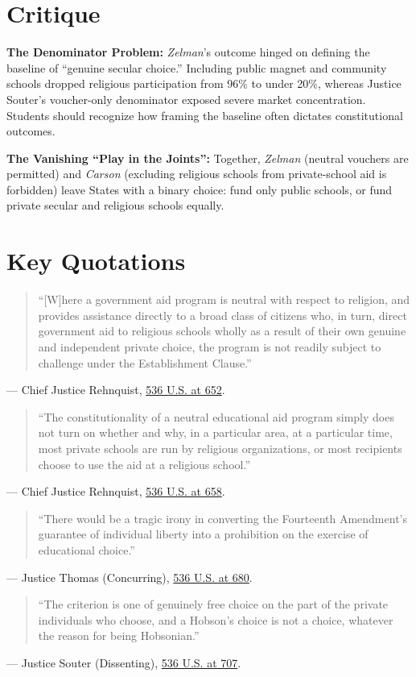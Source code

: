 \documentclass[12pt]{article}
\begin{document}
\section{Critique}
\textbf{The Denominator Problem:} \emph{Zelman}'s outcome hinged on defining the baseline of ``genuine secular choice.'' Including public magnet and community schools dropped religious participation from 96\% to under 20\%, whereas Justice Souter's voucher-only denominator exposed severe market concentration. Students should recognize how framing the baseline often dictates constitutional outcomes.

\textbf{The Vanishing ``Play in the Joints'':} Together, \emph{Zelman} (neutral vouchers are permitted) and \emph{Carson} (excluding religious schools from private-school aid is forbidden) leave States with a binary choice: fund only public schools, or fund private secular and religious schools equally.

\section{Key Quotations}
\begin{quote}
``[W]here a government aid program is neutral with respect to religion, and provides assistance directly to a broad class of citizens who, in turn, direct government aid to religious schools wholly as a result of their own genuine and independent private choice, the program is not readily subject to challenge under the Establishment Clause.''
\end{quote}
\noindent --- Chief Justice Rehnquist, \href{https://supreme.justia.com/cases/federal/us/536/639/}{536 U.S. at 652}.

\begin{quote}
``The constitutionality of a neutral educational aid program simply does not turn on whether and why, in a particular area, at a particular time, most private schools are run by religious organizations, or most recipients choose to use the aid at a religious school.''
\end{quote}
\noindent --- Chief Justice Rehnquist, \href{https://supreme.justia.com/cases/federal/us/536/639/}{536 U.S. at 658}.

\begin{quote}
``There would be a tragic irony in converting the Fourteenth Amendment's guarantee of individual liberty into a prohibition on the exercise of educational choice.''
\end{quote}
\noindent --- Justice Thomas (Concurring), \href{https://supreme.justia.com/cases/federal/us/536/639/}{536 U.S. at 680}.

\begin{quote}
``The criterion is one of genuinely free choice on the part of the private individuals who choose, and a Hobson's choice is not a choice, whatever the reason for being Hobsonian.''
\end{quote}
\noindent --- Justice Souter (Dissenting), \href{https://supreme.justia.com/cases/federal/us/536/639/}{536 U.S. at 707}.
\end{document}
